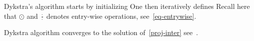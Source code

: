 Dykstra's algorithm starts by initializing  
One then iteratively defines
Recall here that $\odot$ and $\frac{\cdot}{\cdot}$ denotes entry-wise operations, see~\eqref{eq-entrywise}.

 
Dykstra algorithm converges to the solution of~\eqref{proj-inter}
see~\cite{bauschke-lewis}.


% 


